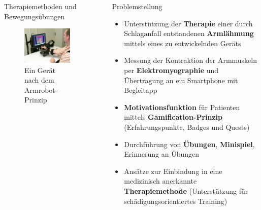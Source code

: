 \documentclass[final,20pt]{beamer}
\newlength{\sepwidth}
\newlength{\colwidth}
\newcommand{\separatorcolumn}{\begin{column}{\sepwidth}\end{column}}
\begin{document}
\begin{frame}[t]
\begin{columns}[t]
\begin{column}{\colwidth}
\begin{alertblock}{Therapiemethoden und Bewegungsübungen}
	\begin{figure}[H]
		\centering
		\includegraphics[width=0.5\colwidth]{pics/armrobot}
		\caption{Ein Gerät nach dem Armrobot-Prinzip}
		\label{fig:armrobot}
	\end{figure}

  \end{alertblock}

\end{column}

\separatorcolumn

\begin{column}{\colwidth}  
	
	\begin{alertblock}{Problemstellung}
		\begin{itemize}
			\item Unterstützung der \textbf{Therapie} einer durch Schlaganfall entstandenen \textbf{Armlähmung} mittels eines zu entwickelnden Geräts
			\item Messung der Kontraktion der Armmuskeln per \textbf{Elektromyographie} und Übertragung an ein Smartphone mit Begleitapp
			\item \textbf{Motivationsfunktion} für Patienten mittels \textbf{Gamification-Prinzip} (Erfahrungspunkte, Badges und Quests)
			\item Durchführung von \textbf{Übungen}, \textbf{Minispiel}, Erinnerung an Übungen
			\item Ansätze zur Einbindung in eine medizinisch anerkannte \textbf{Therapiemethode} (Unterstützung für schädigungsorientiertes Training)
		\end{itemize}
	\end{alertblock}
  

\end{column}
\end{columns}
\end{frame}
\end{document}
